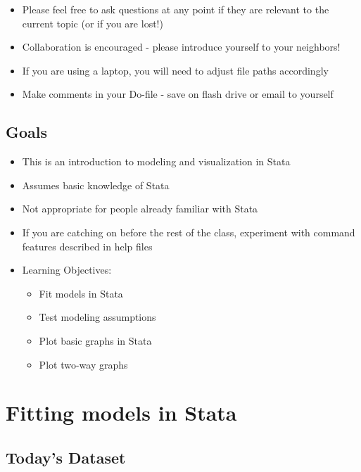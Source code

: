 \documentclass[]{book}
\providecommand{\tightlist}{%
  \setlength{\itemsep}{0pt}\setlength{\parskip}{0pt}}
\begin{document}
\begin{itemize}
\tightlist
\item
  Please feel free to ask questions at any point if they are relevant to the current topic (or if you are lost!)
\item
  Collaboration is encouraged - please introduce yourself to your neighbors!
\item
  If you are using a laptop, you will need to adjust file paths accordingly
\item
  Make comments in your Do-file - save on flash drive or email to yourself
\end{itemize}

\hypertarget{goals-4}{%
\subsection{Goals}\label{goals-4}}

\begin{itemize}
\tightlist
\item
  This is an introduction to modeling and visualization in Stata
\item
  Assumes basic knowledge of Stata
\item
  Not appropriate for people already familiar with Stata
\item
  If you are catching on before the rest of the class, experiment with command features described in help files
\item
  Learning Objectives:

  \begin{itemize}
  \tightlist
  \item
    Fit models in Stata
  \item
    Test modeling assumptions
  \item
    Plot basic graphs in Stata
  \item
    Plot two-way graphs
  \end{itemize}
\end{itemize}

\hypertarget{fitting-models-in-stata}{%
\section{Fitting models in Stata}\label{fitting-models-in-stata}}

\hypertarget{todays-dataset}{%
\subsection{Today's Dataset}\label{todays-dataset}}
\end{document}
